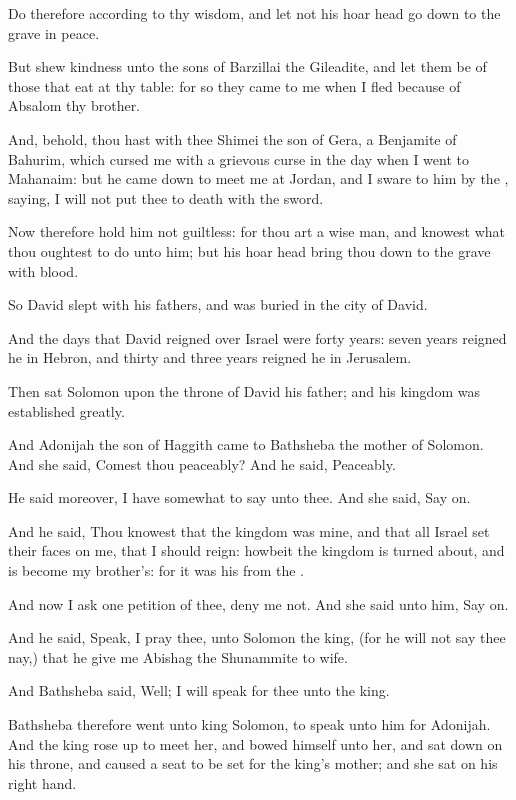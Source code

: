 \Verse Do therefore according to thy wisdom, and let not his hoar head go down to the grave in peace.

\Verse But shew kindness unto the sons of Barzillai the Gileadite, and let them be of those that eat at thy table: for so they came to me when I fled because of Absalom thy brother.

\Verse And, behold, thou hast with thee Shimei the son of Gera, a Benjamite of Bahurim, which cursed me with a grievous curse in the day when I went to Mahanaim: but he came down to meet me at Jordan, and I sware to him by the \LORD, saying, I will not put thee to death with the sword.

\Verse Now therefore hold him not guiltless: for thou art a wise man, and knowest what thou oughtest to do unto him; but his hoar head bring thou down to the grave with blood.

\Verse So David slept with his fathers, and was buried in the city of David.

\Verse And the days that David reigned over Israel were forty years: seven years reigned he in Hebron, and thirty and three years reigned he in Jerusalem.

\Verse Then sat Solomon upon the throne of David his father; and his kingdom was established greatly.

\Verse And Adonijah the son of Haggith came to Bathsheba the mother of Solomon. And she said, Comest thou peaceably? And he said, Peaceably.

\Verse He said moreover, I have somewhat to say unto thee. And she said, Say on.

\Verse And he said, Thou knowest that the kingdom was mine, and that all Israel set their faces on me, that I should reign: howbeit the kingdom is turned about, and is become my brother's: for it was his from the \LORD.

\Verse And now I ask one petition of thee, deny me not. And she said unto him, Say on.

\Verse And he said, Speak, I pray thee, unto Solomon the king, (for he will not say thee nay,) that he give me Abishag the Shunammite to wife.

\Verse And Bathsheba said, Well; I will speak for thee unto the king.

\Verse Bathsheba therefore went unto king Solomon, to speak unto him for Adonijah. And the king rose up to meet her, and bowed himself unto her, and sat down on his throne, and caused a seat to be set for the king's mother; and she sat on his right hand.

